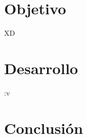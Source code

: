 \documentclass{ArticleTipoUli}[2020/08/10]
\begin{document}



\newpage

\section{Objetivo}
XD

\section{Desarrollo}
:v

\section{Conclusión}


\printbibliography
\end{document}
